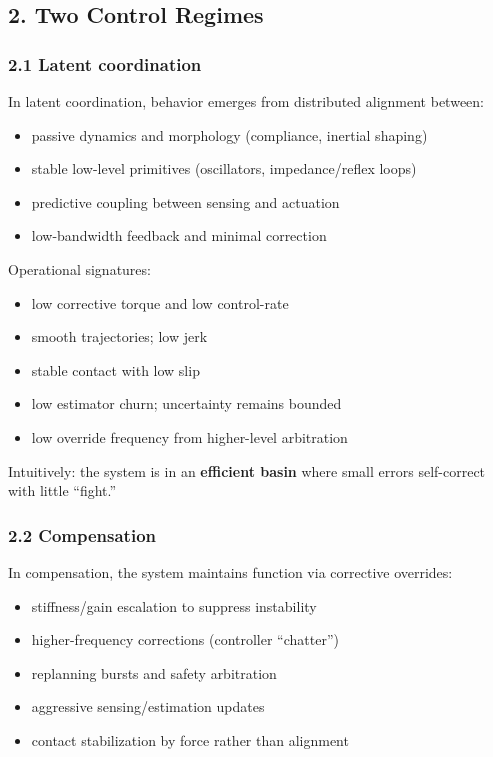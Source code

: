 \documentclass[11pt]{article}
\providecommand{\tightlist}{%
  \setlength{\itemsep}{0pt}\setlength{\parskip}{0pt}}
\begin{document}
\hypertarget{two-control-regimes}{%
\subsection{2. Two Control Regimes}\label{two-control-regimes}}

\hypertarget{latent-coordination}{%
\subsubsection{2.1 Latent coordination}\label{latent-coordination}}

In latent coordination, behavior emerges from distributed alignment between:

\begin{itemize}
\tightlist
\item
  passive dynamics and morphology (compliance, inertial shaping)
\item
  stable low-level primitives (oscillators, impedance/reflex loops)
\item
  predictive coupling between sensing and actuation
\item
  low-bandwidth feedback and minimal correction
\end{itemize}

Operational signatures:

\begin{itemize}
\tightlist
\item
  low corrective torque and low control-rate
\item
  smooth trajectories; low jerk
\item
  stable contact with low slip
\item
  low estimator churn; uncertainty remains bounded
\item
  low override frequency from higher-level arbitration
\end{itemize}

Intuitively: the system is in an \textbf{efficient basin} where small errors self-correct with little ``fight.''

\hypertarget{compensation}{%
\subsubsection{2.2 Compensation}\label{compensation}}

In compensation, the system maintains function via corrective overrides:

\begin{itemize}
\tightlist
\item
  stiffness/gain escalation to suppress instability
\item
  higher-frequency corrections (controller ``chatter'')
\item
  replanning bursts and safety arbitration
\item
  aggressive sensing/estimation updates
\item
  contact stabilization by force rather than alignment
\end{itemize}
\end{document}
